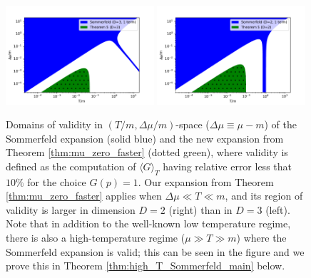 \documentclass[sn-mathphys,Numbered]{sn-jnl}
\begin{document}
\begin{figure}
\centering
\includegraphics[width=0.49\textwidth]{./plot/Sommerfeld_vs_ours_regions_D3_1_term.pdf}
\includegraphics[width=0.49\textwidth]{./plot/Sommerfeld_vs_ours_regions_D2_1_term.pdf}
\caption{Domains of validity in $(T/m,\Delta\mu/m)$-space ($\Delta\mu\equiv\mu-m$) of the Sommerfeld expansion (solid blue) and the new expansion from Theorem \ref{thm:mu_zero_faster} (dotted green),  where validity is defined as the computation of $\langle G\rangle_T$ having relative error  less that $10\%$ for the choice  $G(p)=1$.  Our  expansion from Theorem \ref{thm:mu_zero_faster} applies when $\Delta\mu\ll T\ll m$, and its region of validity is larger in dimension $D=2$ (right) than in $D=3$ (left).  Note that in addition to the well-known low temperature regime, there is also a high-temperature regime ($\mu\gg T\gg m$) where the Sommerfeld expansion is valid; this can be seen in the figure and we prove this in Theorem \ref{thm:high_T_Sommerfeld_main} below. }\label{fig:Thm3_vs_Sommerfeld_regions}
\end{figure}





\end{document}
